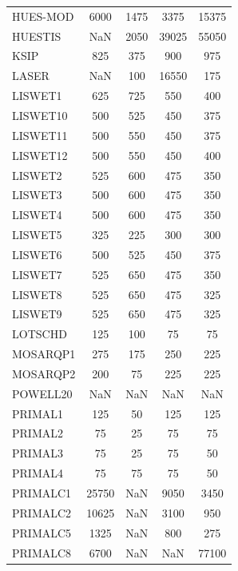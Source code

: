 \begin{longtable}{lcccc}
HUES-MOD &     6000 &  1475 &     3375 &    15375 \\
HUESTIS  &      NaN &  2050 &    39025 &    55050 \\
KSIP     &      825 &   375 &      900 &      975 \\
LASER    &      NaN &   100 &    16550 &      175 \\
LISWET1  &      625 &   725 &      550 &      400 \\
LISWET10 &      500 &   525 &      450 &      375 \\
LISWET11 &      500 &   550 &      450 &      375 \\
LISWET12 &      500 &   550 &      450 &      400 \\
LISWET2  &      525 &   600 &      475 &      350 \\
LISWET3  &      500 &   600 &      475 &      350 \\
LISWET4  &      500 &   600 &      475 &      350 \\
LISWET5  &      325 &   225 &      300 &      300 \\
LISWET6  &      500 &   525 &      450 &      375 \\
LISWET7  &      525 &   650 &      475 &      350 \\
LISWET8  &      525 &   650 &      475 &      325 \\
LISWET9  &      525 &   650 &      475 &      325 \\
LOTSCHD  &      125 &   100 &       75 &       75 \\
MOSARQP1 &      275 &   175 &      250 &      225 \\
MOSARQP2 &      200 &    75 &      225 &      225 \\
POWELL20 &      NaN &   NaN &      NaN &      NaN \\
PRIMAL1  &      125 &    50 &      125 &      125 \\
PRIMAL2  &       75 &    25 &       75 &       75 \\
PRIMAL3  &       75 &    25 &       75 &       50 \\
PRIMAL4  &       75 &    75 &       75 &       50 \\
PRIMALC1 &    25750 &   NaN &     9050 &     3450 \\
PRIMALC2 &    10625 &   NaN &     3100 &      950 \\
PRIMALC5 &     1325 &   NaN &      800 &      275 \\
PRIMALC8 &     6700 &   NaN &      NaN &    77100 \\

\end{longtable}
